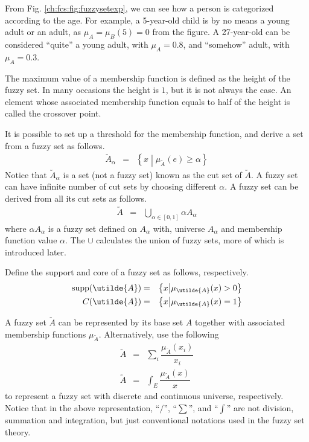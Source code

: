 From Fig. \ref{ch:fcs:fig:fuzzysetexp}, we can see how a person is categorized according to the age. For example, a 5-year-old child is by no means a young adult or an adult, as $\mu_{A}=\mu_{B}(5)=0$ from the figure. A 27-year-old can be considered ``quite'' a young adult, with $\mu_{A}=0.8$, and ``somehow'' adult, with $\mu_{A}=0.3$.

The maximum value of a membership function is defined as the height of the fuzzy set. In many occasions the height is $1$, but it is not always the case. An element whose associated membership function equals to half of the height is called the crossover point.

It is possible to set up a threshold for the membership function, and derive a set from a fuzzy set as follows.
\begin{eqnarray}
	\utilde{A}_\alpha &=& \left\{x \middle| \mu_{\utilde{A}} (e) \geq \alpha \right\} \nonumber
\end{eqnarray}
Notice that $\utilde{A}_\alpha$ is a set (not a fuzzy set) known as the cut set of $\utilde{A}$. A fuzzy set can have infinite number of cut sets by choosing different $\alpha$. A fuzzy set can be derived from all its cut sets as follows.
\begin{eqnarray}
	\utilde{A} &=& \bigcup_{\alpha \in [0, 1]} \alpha A_\alpha \nonumber
\end{eqnarray}
where $\alpha A_\alpha$ is a fuzzy set defined on $A_\alpha$ with, universe $A_\alpha$ and membership function value $\alpha$. The $\cup$ calculates the union of fuzzy sets, more of which is introduced later.

Define the support and core of a fuzzy set as follows, respectively.
\begin{eqnarray}
	\textup{supp}(\utilde{A}) &=& \left\{x \middle| \mu_{\utilde{A}}(x) > 0 \right\} \nonumber \\
	C(\utilde{A}) &=& \left\{x \middle| \mu_{\utilde{A}}(x) = 1 \right\} \nonumber
\end{eqnarray}

A fuzzy set $\utilde{A}$ can be represented by its base set $A$ together with associated membership functions $\mu_{\utilde{A}}$. Alternatively, use the following
\begin{eqnarray}
	\utilde{A} &=& \sum_{i} \dfrac{\mu_{\utilde{A}}(x_i)}{x_i} \nonumber \\
	\utilde{A} &=& \int_{E} \dfrac{\mu_{\utilde{A}}(x)}{x} \nonumber
\end{eqnarray}
to represent a fuzzy set with discrete and continuous universe, respectively. Notice that in the above representation, ``$/$'', ``$\sum$'', and ``$\int$'' are not division, summation and integration, but just conventional notations used in the fuzzy set theory.

